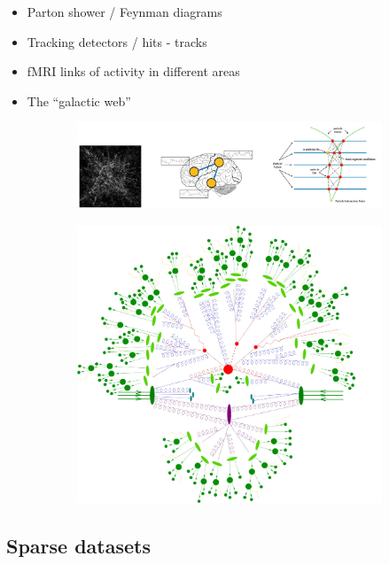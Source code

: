 \begin{itemize}
	\item Parton shower / Feynman diagrams
	\item Tracking detectors / hits - tracks
	\item fMRI links of activity in different areas
	\item The “galactic web”
\end{itemize}


\begin{figure}[ht]
	\centering
	\begin{subfigure}{.75\textwidth}
		\centering
		\includegraphics[width=0.9\linewidth]{figure_ml/graph_phys}
	\end{subfigure}%
	\begin{subfigure}{.25\textwidth}
		\centering
		\includegraphics[width=0.9\linewidth]{figure_ml/feynman}
	\end{subfigure}%
\end{figure}

\subsection{Sparse datasets}


